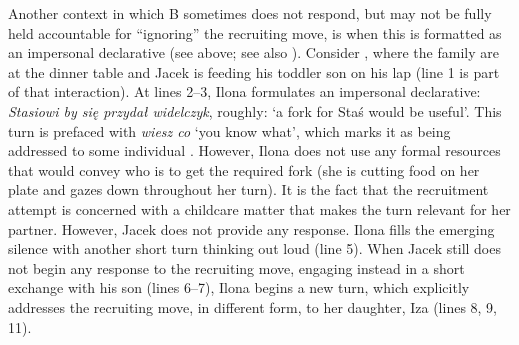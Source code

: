 \documentclass[output=paper]{langsci/langscibook}
\begin{document}
Another context in which B sometimes does not respond, but may not be fully held accountable for ``ignoring'' the recruiting move, is when this is formatted as an impersonal declarative (see  above; see also \citealt{RossiZinken2016}).  Consider , where the family are at the dinner table and Jacek is feeding his toddler son on his lap (line 1 is part of that interaction).  At lines 2--3, Ilona formulates an impersonal declarative: \textit{Stasiowi by się przydał widelczyk}, roughly: `a fork for Staś would be useful'.  This turn is prefaced with \textit{wiesz co} `you know what', which marks it as being addressed to some individual \citep{Lerner2003}.  However, Ilona does not use any formal resources that would convey who is to get the required fork (she is cutting food on her plate and gazes down throughout her turn). It is the fact that the recruitment attempt is concerned with a childcare matter that makes the turn relevant for her partner.  However, Jacek does not provide any response.  Ilona fills the emerging silence with another short turn thinking out loud (line 5).  When Jacek still does not begin any response to the recruiting move, engaging instead in a short exchange with his son (lines 6--7), Ilona begins a new turn, which explicitly addresses the recruiting move, in different form, to her daughter, Iza (lines 8, 9, 11).
\end{document}
